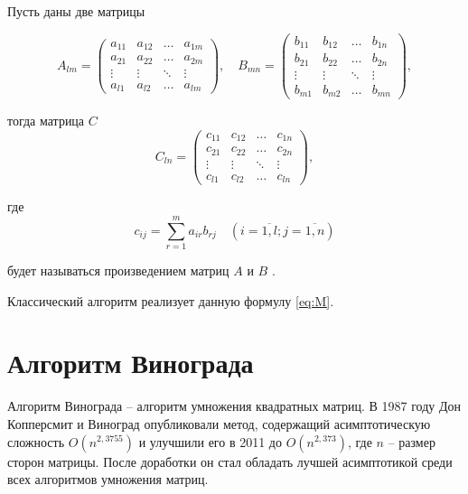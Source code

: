 Пусть даны две матрицы

\begin{equation}
	A_{lm} = \begin{pmatrix}
		a_{11} & a_{12} & \ldots & a_{1m}\\
		a_{21} & a_{22} & \ldots & a_{2m}\\
		\vdots & \vdots & \ddots & \vdots\\
		a_{l1} & a_{l2} & \ldots & a_{lm}
	\end{pmatrix},
	\quad
	B_{mn} = \begin{pmatrix}
		b_{11} & b_{12} & \ldots & b_{1n}\\
		b_{21} & b_{22} & \ldots & b_{2n}\\
		\vdots & \vdots & \ddots & \vdots\\
		b_{m1} & b_{m2} & \ldots & b_{mn}
	\end{pmatrix},
\end{equation}

тогда матрица $C$
\begin{equation}
	C_{ln} = \begin{pmatrix}
		c_{11} & c_{12} & \ldots & c_{1n}\\
		c_{21} & c_{22} & \ldots & c_{2n}\\
		\vdots & \vdots & \ddots & \vdots\\
		c_{l1} & c_{l2} & \ldots & c_{ln}
	\end{pmatrix},
\end{equation}

где
\begin{equation}
	\label{eq:M}
	c_{ij} =
	\sum_{r=1}^{m} a_{ir}b_{rj} \quad (i=\overline{1,l}; j=\overline{1,n})
\end{equation}

будет называться произведением матриц $A$ и $B$ \cite{book_matrix}.

Классический алгоритм реализует данную формулу \ref{eq:M}.

\section{Алгоритм Винограда}

Алгоритм Винограда \cite{book_vinograd} – алгоритм умножения квадратных матриц.
В 1987 году Дон Копперсмит и Виноград опубликовали метод, содержащий асимптотическую сложность $O(n^{2,3755})$ и улучшили его в 2011 до $O(n^{2,373})$, где $n$ -- размер сторон матрицы. После доработки он стал обладать лучшей асимптотикой среди всех алгоритмов умножения матриц.

